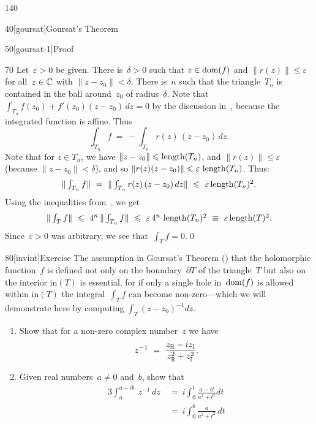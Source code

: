 \begin{parsec}{140}
\begin{point}{40}[goursat]{Goursat's Theorem}
\begin{point}{50}[goursat-1]{Proof}
\begin{point}{70}
Let~$\varepsilon >0$ be given.
There is~$\delta>0$
such that $z\in\operatorname{dom}(f)$
and $\|r(z)\|\leq \varepsilon$
for all~$z\in \mathbb{C}$ with $\|z-z_0\|<\delta$.
There is~$n$ such that the triangle~$T_n$ is contained
in the ball around~$z_0$ of radius~$\delta$.
Note that $\int_{T_n} f(z_0)+f'(z_0)(z-z_0)\,dz=0$
by the discussion in~, because
the integrated function is affine.
Thus
\begin{equation*}
\textstyle
\int_{T_n} f \  = \ -\int_{T_n}r(z)\,(z-z_0)\,dz.
\end{equation*}
Note that for $z\in T_n$,
we have  $\|z-z_0\|\leqslant \operatorname{length}(T_n)$,
and $\|r(z)\|\leq \varepsilon$ (because $\|z-z_0\|< \delta$),
and so $\|r(z)(z-z_0)\|\leqslant \varepsilon\,\operatorname{length}(T_n)$.
Thus:
\begin{equation*}
\textstyle
\|\int_{T_n} f\| \  = \ \|\int_{T_n}r(z)\,(z-z_0)\,dz\|
\ \leqslant\ \varepsilon\operatorname{length}(T_n)^2.
\end{equation*}
Using the inequalities from~,
we get
\begin{equation*}
\textstyle
\|\int_T f\|\ \leqslant\ 4^n\, \|\int_{T_n} f\|
\ \leqslant\ \varepsilon \,4^n\,\operatorname{length}(T_n)^2 
\ \equiv\ \varepsilon \operatorname{length}(T)^2.
\end{equation*}
Since~$\varepsilon>0$ was arbitrary,
we see that~$\int_T f=0$.\qed
\end{point}
\end{point}
\end{point}%
\begin{point}{80}[invint]{Exercise}%
	The assumption in Goursat's Theorem ()
that the holomorphic function~$f$
is defined not only on the boundary~$\partial T$
of the triangle~$T$
but also on the interior $\mathrm{in}(T)$
is essential,
for if only a single hole in~$\operatorname{dom}(f)$ is allowed within $\mathrm{in}(T)$
the integral~$\int_T f$ can become non-zero---which we will demonstrate
here by computing
$\int_T (z-z_0)^{-1}dz$.
\begin{enumerate}%
\item
Show that for a non-zero
complex number~$z$ we have
\begin{equation*}
	z^{-1}\ =\  \frac{\Real{z}-i\Imag{z}}{\Real{z}^2+\Imag{z}^2}.
\end{equation*}
\item
Given real numbers~$a\neq 0$ and~$b$,
show that
\begin{alignat*}{3}
	\int_{a}^{a+ib}\ 
	z^{-1}\,dz
	\ &=\ 
	i\int_{0}^t \frac{a-it}{a^2+t^2}dt
	\\
	\ &=\ 
	i\int_0^b \frac{a}{a^2+t^2}\,dt 

\end{alignat*}
\end{enumerate}
\end{point}
\end{parsec}
